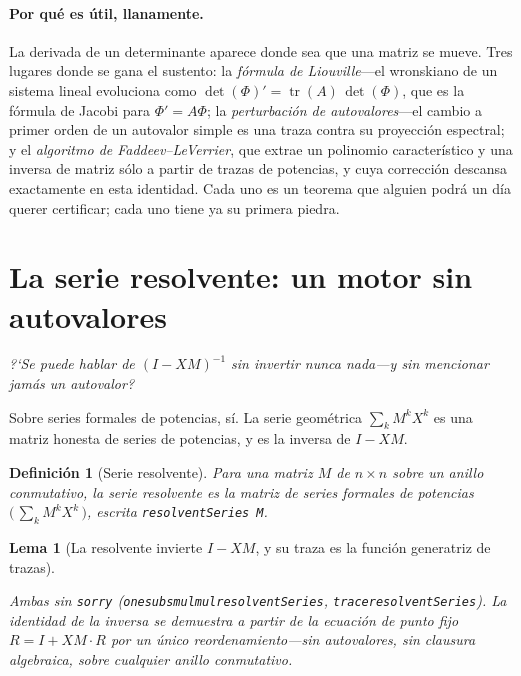 \documentclass[11pt]{article}
\newtheorem{lemma}{Lema}
\newtheorem{definition}{Definici\'on}
\newcommand{\lean}[1]{{\def\_{\textunderscore\allowbreak}\texttt{#1}}}
\newcommand{\tr}{\operatorname{tr}}
\newcommand{\keyeq}[1]{\begin{center}\keybox{$\displaystyle #1$}\end{center}}
\begin{document}
\paragraph{Por qu\'e es \'util, llanamente.}
La derivada de un determinante aparece donde sea que una matriz se mueve. Tres lugares donde se gana
el sustento: la \emph{f\'ormula de Liouville}---el wronskiano de un sistema lineal evoluciona como
$\det(\Phi)'=\tr(A)\,\det(\Phi)$, que es la f\'ormula de Jacobi para $\Phi'=A\Phi$; la
\emph{perturbaci\'on de autovalores}---el cambio a primer orden de un autovalor simple es una traza
contra su proyecci\'on espectral; y el \emph{algoritmo de Faddeev--LeVerrier}, que extrae un polinomio
caracter\'istico y una inversa de matriz s\'olo a partir de trazas de potencias, y cuya correcci\'on
descansa exactamente en esta identidad. Cada uno es un teorema que alguien podr\'a un d\'ia querer
certificar; cada uno tiene ya su primera piedra.

\section{La serie resolvente: un motor sin autovalores}
\label{sec:resolvent}

\emph{?`Se puede hablar de $(I-XM)^{-1}$ sin invertir nunca nada---y sin mencionar jam\'as un
autovalor?}

Sobre series formales de potencias, s\'i. La serie geom\'etrica $\sum_k M^kX^k$ es una matriz honesta
de series de potencias, y es la inversa de $I-XM$.

\begin{definition}[Serie resolvente]
Para una matriz $M$ de $n\times n$ sobre un anillo conmutativo, la \emph{serie resolvente} es la
matriz de series formales de potencias $\bigl(\,\sum_k M^k X^k\,\bigr)$, escrita
\lean{resolventSeries M}.
\end{definition}

\begin{lemma}[La resolvente invierte $I-XM$, y su traza es la funci\'on generatriz de trazas]
\label{lem:resolvent}
\keyeq{(I-XM)\cdot\textstyle\sum_k M^kX^k\;=\;I,\qquad
   \tr\!\bigl(\textstyle\sum_k M^kX^k\bigr)\;=\;\sum_k \tr(M^k)\,X^k.}
Ambas sin \lean{sorry} (\lean{one\_sub\_smul\_mul\_resolventSeries}, \lean{trace\_resolventSeries}). La
identidad de la inversa se demuestra a partir de la ecuaci\'on de punto fijo $R=I+XM\!\cdot\!R$ por un
\'unico reordenamiento---sin autovalores, sin clausura algebraica, sobre cualquier anillo conmutativo.
\end{lemma}
\end{document}
